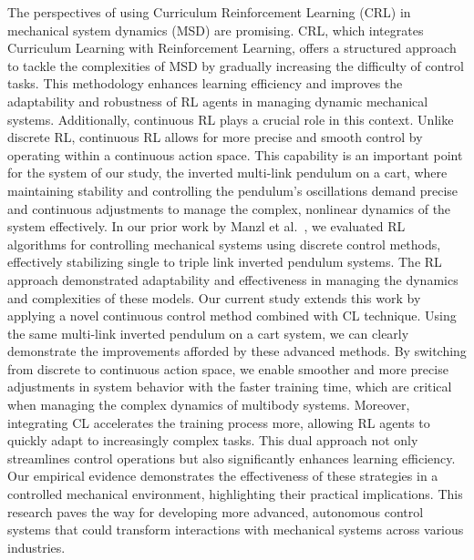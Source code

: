 The perspectives of using Curriculum Reinforcement Learning (CRL) in mechanical system dynamics (MSD) are promising. CRL, which integrates Curriculum Learning with Reinforcement Learning, offers a structured approach to tackle the complexities of MSD by gradually increasing the difficulty of control tasks. This methodology enhances learning efficiency and improves the adaptability and robustness of RL agents in managing dynamic mechanical systems. Additionally, continuous RL plays a crucial role in this context. Unlike discrete RL, continuous RL allows for more precise and smooth control by operating within a continuous action space. This capability is an important point for the system of our study, the inverted multi-link pendulum on a cart, where maintaining stability and controlling the pendulum’s oscillations demand precise and continuous adjustments to manage the complex, nonlinear dynamics of the system effectively. In our prior work by Manzl et al.~\cite{manzl2023relrl}, we evaluated RL algorithms for controlling mechanical systems using discrete control methods, effectively stabilizing single to triple link inverted pendulum systems. The RL approach demonstrated adaptability and effectiveness in managing the dynamics and complexities of these models. Our current study extends this work by applying a novel continuous control method combined with CL technique. Using the same multi-link inverted pendulum on a cart system, we can clearly demonstrate the improvements afforded by these advanced methods. By switching from discrete to continuous action space, we enable smoother and more precise adjustments in system behavior with the faster training time, which are critical when managing the complex dynamics of multibody systems. Moreover, integrating CL accelerates the training process more, allowing RL agents to quickly adapt to increasingly complex tasks. This dual approach not only streamlines control operations but also significantly enhances learning efficiency. Our empirical evidence demonstrates the effectiveness of these strategies in a controlled mechanical environment, highlighting their practical implications. This research paves the way for developing more advanced, autonomous control systems that could transform interactions with mechanical systems across various industries.